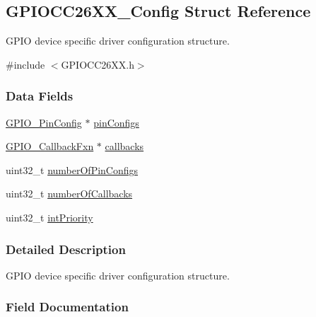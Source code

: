 \subsection{G\+P\+I\+O\+C\+C26\+X\+X\+\_\+\+Config Struct Reference}
\label{struct_g_p_i_o_c_c26_x_x___config}


G\+P\+I\+O device specific driver configuration structure.  




{\ttfamily \#include $<$G\+P\+I\+O\+C\+C26\+X\+X.\+h$>$}

\subsubsection*{Data Fields}
\begin{DoxyCompactItemize}
\item 
\hyperlink{_g_p_i_o_8h_a7f5d979226db633309b3fdc0f4a8aef6}{G\+P\+I\+O\+\_\+\+Pin\+Config} $\ast$ \hyperlink{struct_g_p_i_o_c_c26_x_x___config_a68e77c4393d8ce8da87060e9ebda485a}{pin\+Configs}
\item 
\hyperlink{_g_p_i_o_8h_a7814871ec922ed619c98b8e8c323372c}{G\+P\+I\+O\+\_\+\+Callback\+Fxn} $\ast$ \hyperlink{struct_g_p_i_o_c_c26_x_x___config_a889dc0d27aa313d15bbfa6fbe94ed7ab}{callbacks}
\item 
uint32\+\_\+t \hyperlink{struct_g_p_i_o_c_c26_x_x___config_ae5978d3a1a3c9b05cd47d8e3b9a875fd}{number\+Of\+Pin\+Configs}
\item 
uint32\+\_\+t \hyperlink{struct_g_p_i_o_c_c26_x_x___config_ad8d28533d6cb78c62e5a371ce9c6f00c}{number\+Of\+Callbacks}
\item 
uint32\+\_\+t \hyperlink{struct_g_p_i_o_c_c26_x_x___config_a7f628362609f5d1cea2733083ddccedf}{int\+Priority}
\end{DoxyCompactItemize}


\subsubsection{Detailed Description}
G\+P\+I\+O device specific driver configuration structure. 

\subsubsection{Field Documentation}
